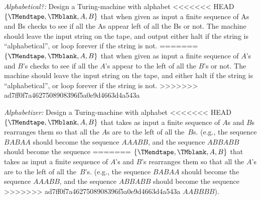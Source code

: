 \documentclass[../../../include/open-logic-section]{subfiles}
\begin{document}
\begin{prob}
\emph{Alphabetical?:} Design a Turing-machine with alphabet
<<<<<<< HEAD
$\{\TMendtape,\TMblank, A, B\}$ that when given as input a finite sequence of As
and Bs checks to see if all the As appear left of all the Bs or
not. The machine should leave the input string on the tape, and output
either halt if the string is ``alphabetical'', or loop forever if the
string is not.
=======
$\{\TMendtape,\TMblank, A, B\}$ that when given as input a finite
sequence of $A$'s and $B$'s checks to see if all the $A$'s appear to
the left of all the $B$'s or not. The machine should leave the input
string on the tape, and either halt if the string is
``alphabetical'', or loop forever if the string is not.
>>>>>>> ad7ff0f7a4627508908396f5a0e9d4663d4a543a
\end{prob}

\begin{prob}
\emph{Alphabetizer:} Design a Turing-machine with alphabet
<<<<<<< HEAD
$\{\TMendtape,\TMblank, A, B\}$ that takes as input a finite sequence of $A$s and
$B$s rearranges them so that all the $A$s are to the left of all
the~$B$s. (e.g., the sequence $BABAA$ should become the sequence
$AAABB$, and the sequence $ABBABB$ should become the sequence
=======
$\{\TMendtape,\TMblank, A, B\}$ that takes as input a finite sequence
of $A$'s and $B$'s rearranges them so that all the $A$'s are to the
left of all the~$B$'s. (e.g., the sequence $BABAA$ should become the
sequence $AAABB$, and the sequence $ABBABB$ should become the sequence
>>>>>>> ad7ff0f7a4627508908396f5a0e9d4663d4a543a
$AABBBB$).
\end{prob}
\end{document}
